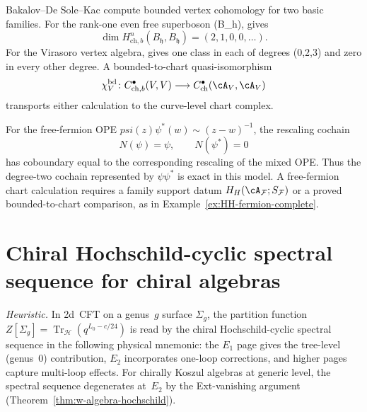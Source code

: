 Bakalov--De Sole--Kac compute bounded vertex cohomology for two basic
families.  For the rank-one even free superboson (B_{\mathfrak h}),
\cite[Theorem~7.4]{BDSK21} gives
\[
 \dim H^n_{\mathrm{ch},b}(B_{\mathfrak h},B_{\mathfrak h})
 =(2,1,0,0,\ldots).
\]
For the Virasoro vertex algebra, \cite[Theorem~7.2]{BDSK21} gives one
class in each of degrees (0,2,3) and zero in every other degree.
A bounded-to-chart quasi-isomorphism
\[
 \chi_V^{\mathrm{bd}}\colon
 C^\bullet_{\mathrm{ch},b}(V,V)
 \longrightarrow C^\bullet_{\mathrm{ch}}(\cA_V,\cA_V)
\]
transports either calculation to the curve-level chart complex.

For the free-fermion OPE
\(psi(z)\psi^*(w)\sim(z-w)^{-1}\), the rescaling cochain
\[
 N(\psi)=\psi,\qquad N(\psi^*)=0
\]
has coboundary equal to the corresponding rescaling of the mixed OPE.
Thus the degree-two cochain represented by
\(\psi\psi^*\) is exact in this model.  A free-fermion chart
calculation requires a family support datum
\(H_H(\cA_{\mathcal F};S_{\mathcal F})\) or a proved
bounded-to-chart comparison, as in
Example~\ref{ex:HH-fermion-complete}.

\section{Chiral Hochschild-cyclic spectral sequence for chiral algebras}
\label{sec:hochschild-cyclic-spectral}

\begin{remark}
\emph{Heuristic.} In 2d~CFT on a genus~$g$ surface $\Sigma_g$, the partition function
$Z[\Sigma_g] = \operatorname{Tr}_{\mathcal{H}}(q^{L_0-c/24})$ is
read by the chiral Hochschild-cyclic spectral sequence in the
following physical mnemonic: the $E_1$ page
gives the tree-level (genus~$0$) contribution, $E_2$ incorporates
one-loop corrections, and higher pages capture multi-loop effects.
For chirally Koszul algebras at generic level, the spectral sequence
degenerates at~$E_2$ by the Ext-vanishing argument
(Theorem~\ref{thm:w-algebra-hochschild}).
\end{remark}

